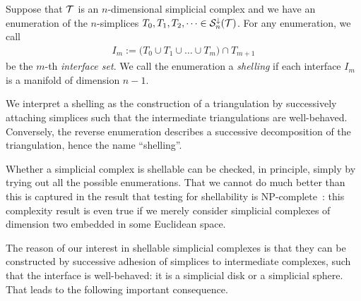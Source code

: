 \documentclass[12pt,a4paper]{article}
\begin{document}
Suppose that ${\mathcal T}$ is an $n$-dimensional simplicial complex and we have an enumeration of the $n$-simplices $T_{0}, T_{1}, T_{2}, \dots \in {\mathcal S}^{\downarrow}_{n}({\mathcal T})$.
For any enumeration, we call 
\begin{align*}
    I_m 
    := 
    \big( 
        T_{0} \cup T_{1} \cup \dots \cup T_{m} 
    \big) 
    \cap 
    T_{m+1}
\end{align*}
be the $m$-th \textit{interface set}. 
We call the enumeration a \emph{shelling} if each interface $I_m$ is a manifold of dimension $n-1$. 

\begin{remark}
    We interpret a shelling as the construction of a triangulation 
    by successively attaching simplices such that the intermediate triangulations are well-behaved. 
    Conversely, the reverse enumeration describes a successive decomposition of the triangulation, hence the name ``shelling''.
\end{remark}
\begin{remark}
    Whether a simplicial complex is shellable can be checked, in principle, simply by trying out all the possible enumerations.
    That we cannot do much better than this is captured in the result that testing for shellability is NP-complete~\cite{goaoc2019shellability}:
    this complexity result is even true if we merely consider simplicial complexes of dimension two embedded in some Euclidean space.
\end{remark}




The reason of our interest in shellable simplicial complexes is that they can be constructed by successive adhesion of simplices to intermediate complexes, 
such that the interface is well-behaved: it is a simplicial disk or a simplicial sphere. 
That leads to the following important consequence.
\end{document}
